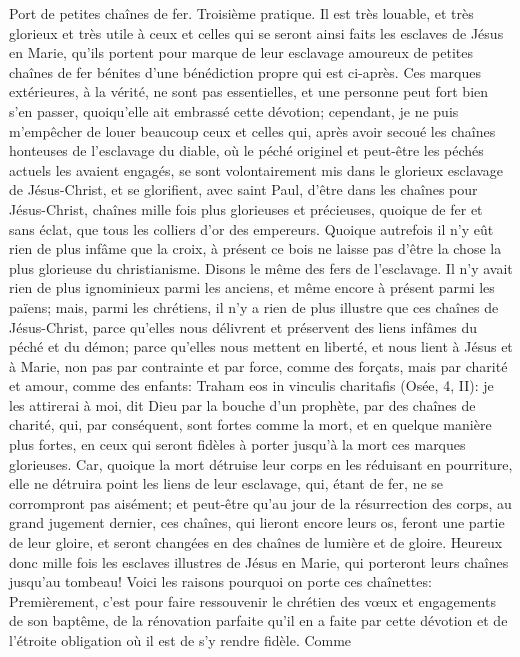 Port de petites chaînes de fer.
 Troisième pratique. Il est très louable, et très glorieux et très utile à ceux et celles qui se seront ainsi faits les
esclaves de Jésus en Marie, qu'ils portent pour marque de leur esclavage amoureux de petites chaînes de fer
bénites d'une bénédiction propre qui est ci-après.
Ces marques extérieures, à la vérité, ne sont pas essentielles, et une personne peut fort bien s'en passer,
quoiqu'elle ait embrassé cette dévotion; cependant, je ne puis m'empêcher de louer beaucoup ceux et celles qui,
après avoir secoué les chaînes honteuses de l'esclavage du diable, où le péché originel et peut-être les péchés
actuels les avaient engagés, se sont volontairement mis dans le glorieux esclavage de Jésus-Christ, et se
glorifient, avec saint Paul, d'être dans les chaînes pour Jésus-Christ, chaînes mille fois plus glorieuses et
précieuses, quoique de fer et sans éclat, que tous les colliers d'or des empereurs.
 Quoique autrefois il n'y eût rien de plus infâme que la croix, à présent ce bois ne laisse pas d'être la chose la
plus glorieuse du christianisme. Disons le même des fers de l'esclavage. Il n'y avait rien de plus ignominieux parmi
les anciens, et même encore à présent parmi les païens; mais, parmi les chrétiens, il n'y a rien de plus illustre que
ces chaînes de Jésus-Christ, parce qu'elles nous délivrent et préservent des liens infâmes du péché et du démon;
parce qu'elles nous mettent en liberté, et nous lient à Jésus et à Marie, non pas par contrainte et par force, comme
des forçats, mais par charité et amour, comme des enfants: Traham eos in vinculis charitafis (Osée, 4, II): je les
attirerai à moi, dit Dieu par la bouche d'un prophète, par des chaînes de charité, qui, par conséquent, sont fortes
comme la mort, et en quelque manière plus fortes, en ceux qui seront fidèles à porter jusqu'à la mort ces marques
glorieuses. Car, quoique la mort détruise leur corps en les réduisant en pourriture, elle ne détruira point les liens de
leur esclavage, qui, étant de fer, ne se corrompront pas aisément; et peut-être qu'au jour de la résurrection des
corps, au grand jugement dernier, ces chaînes, qui lieront encore leurs os, feront une partie de leur gloire, et
seront changées en des chaînes de lumière et de gloire. Heureux donc mille fois les esclaves illustres de Jésus en
Marie, qui porteront leurs chaînes jusqu'au tombeau!
 Voici les raisons pourquoi on porte ces chaînettes:
Premièrement, c'est pour faire ressouvenir le chrétien des vœux et engagements de son baptême, de la
rénovation parfaite qu'il en a faite par cette dévotion et de l'étroite obligation où il est de s'y rendre fidèle. Comme

